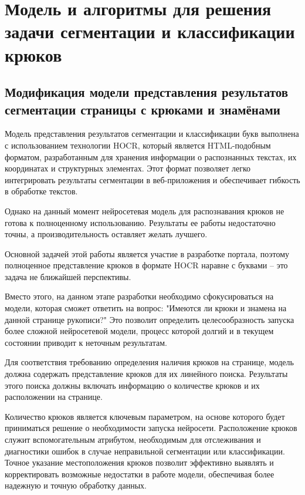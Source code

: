 \chapter{Модель и алгоритмы для решения задачи сегментации и классификации крюков}

\section{Модификация модели представления результатов сегментации страницы с крюками и знамёнами}

Модель представления результатов сегментации и классификации букв выполнена с использованием технологии HOCR, который является HTML-подобным 
форматом, разработанным для хранения информации о распознанных текстах, их координатах и структурных элементах. 
Этот формат позволяет легко интегрировать результаты сегментации в веб-приложения и обеспечивает гибкость в 
обработке текстов\cite{MMemon}.


Однако на данный момент нейросетевая модель для распознавания крюков не готова к полноценному использованию. 
Результаты ее работы недостаточно точны, а производительность оставляет желать лучшего. 



Основной задачей этой работы является участие в разработке портала, поэтому полноценное представление крюков в формате HOCR 
наравне с буквами – это задача не ближайшей перспективы.

Вместо этого, на данном этапе разработки необходимо сфокусироваться на модели, которая сможет ответить на вопрос: 
"Имеются ли крюки и знамена на данной странице рукописи?" Это позволит определить целесообразность запуска более 
сложной нейросетевой модели, процесс которой долгий и в текущем состоянии приводит к неточным результатам.

Для соответствия требованию определения наличия крюков на странице, модель должна содержать представление крюков 
для их линейного поиска. Результаты этого поиска должны включать информацию о количестве крюков и их расположении 
на странице.

Количество крюков является ключевым параметром, на основе которого будет приниматься решение о необходимости 
запуска нейросети. Расположение крюков служит вспомогательным атрибутом, необходимым для отслеживания и 
диагностики ошибок в случае неправильной сегментации или классификации. Точное указание местоположения крюков 
позволит эффективно выявлять и корректировать возможные недостатки в работе модели, обеспечивая более 
надежную и точную обработку данных.

